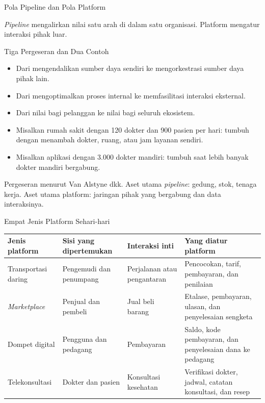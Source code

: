\documentclass[aspectratio=169, table, 12pt]{beamer}
\begin{document}
\begin{frame}{{\Large Pola Pipeline dan Pola Platform}}
  \centering
  \resizebox{!}{0.64\textheight}{}

  \vspace{2pt}
  {\footnotesize \textit{Pipeline} mengalirkan nilai satu arah di dalam satu organisasi. Platform mengatur interaksi pihak luar.\par}
\end{frame}

\begin{frame}{{\Large Tiga Pergeseran dan Dua Contoh}}
  \begin{itemize}
    \item Dari mengendalikan sumber daya sendiri ke mengorkestrasi sumber daya pihak lain.
    \item Dari mengoptimalkan proses internal ke memfasilitasi interaksi eksternal.
    \item Dari nilai bagi pelanggan ke nilai bagi seluruh ekosistem.
    \item Misalkan rumah sakit dengan 120 dokter dan 900 pasien per hari: tumbuh dengan menambah dokter, ruang, atau jam layanan sendiri.
    \item Misalkan aplikasi dengan 3.000 dokter mandiri: tumbuh saat lebih banyak dokter mandiri bergabung.
  \end{itemize}
  \vspace{2pt}
  {\footnotesize Pergeseran menurut Van Alstyne dkk. Aset utama \textit{pipeline}: gedung, stok, tenaga kerja. Aset utama platform: jaringan pihak yang bergabung dan data interaksinya.\par}
\end{frame}

\begin{frame}{{\Large Empat Jenis Platform Sehari-hari}}
  \footnotesize
  \begin{tabularx}{\textwidth}{>{\raggedright\arraybackslash}p{2.7cm}
      >{\raggedright\arraybackslash}p{2.9cm}
      >{\raggedright\arraybackslash}p{2.7cm}
      >{\raggedright\arraybackslash}X}
    \hline
    \textbf{Jenis platform} & \textbf{Sisi yang dipertemukan} & \textbf{Interaksi inti} & \textbf{Yang diatur platform} \\ \hline
    Transportasi daring & Pengemudi dan penumpang & Perjalanan atau pengantaran & Pencocokan, tarif, pembayaran, dan penilaian \\ \hline
    \textit{Marketplace} & Penjual dan pembeli & Jual beli barang & Etalase, pembayaran, ulasan, dan penyelesaian sengketa \\ \hline
    Dompet digital & Pengguna dan pedagang & Pembayaran & Saldo, kode pembayaran, dan penyelesaian dana ke pedagang \\ \hline
    Telekonsultasi & Dokter dan pasien & Konsultasi kesehatan & Verifikasi dokter, jadwal, catatan konsultasi, dan resep \\ \hline
  \end{tabularx}
\end{frame}
\end{document}
